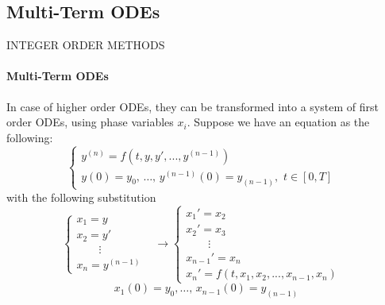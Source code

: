 \subsection{Multi-Term ODEs}
\begin{frame}{INTEGER ORDER METHODS}
    \framesubtitle{Multi-Term ODEs}
    In case of higher order ODEs, they can be transformed into a system of first order ODEs, using phase variables $x_i$. Suppose we have an equation as the following:
    \begin{equation}\label{eq:generalDiff}
    \begin{cases}
    y^{(n)}=f\left(t,y,y',...,y^{(n-1)}\right)&\\
    y(0)=y_0,\,\dots,\,y^{(n - 1)}(0)= y_{(n - 1)},\,\,t\in[0,T]&
    \end{cases}
    \end{equation}
    with the following substitution
    \begin{equation}
    \begin{cases}
        x_1 = y&\\
        x_2 = y'&\\
        \qquad\vdots&\\
        x_n = y^{(n-1)}&
    \end{cases}\longrightarrow\begin{cases}
        x_1'=x_2&\\
        x_2'=x_3&\\
        \qquad\vdots&\\
        x_{n-1}'=x_n&\\
        x_n'=f\left(t,x_1,x_2,...,x_{n-1},x_n\right)
    \end{cases}
\end{equation}
\begin{equation*}
    x_1(0)=y_0,\dots,\,x_{n - 1}(0)= y_{(n - 1)}
\end{equation*}

\end{frame}

